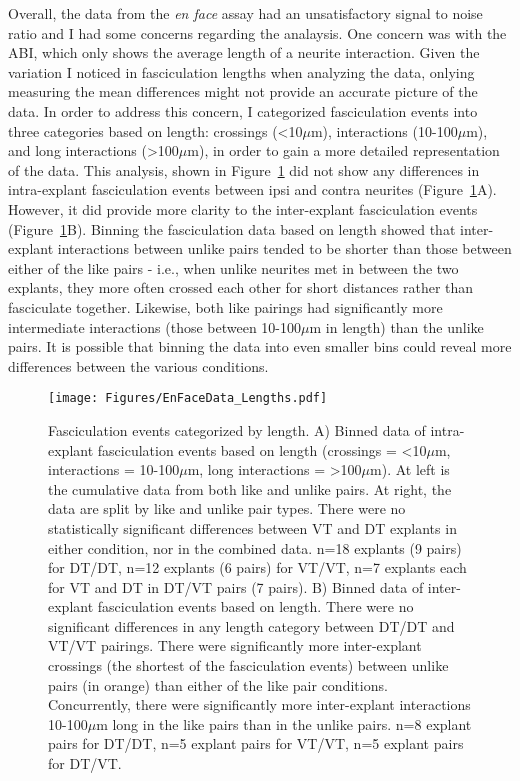 Overall, the data from the \emph{en face} assay had an unsatisfactory signal to noise ratio and I had some concerns regarding the analaysis.
One concern was with the ABI, which only shows the average length of a neurite interaction.
Given the variation I noticed in fasciculation lengths when analyzing the data, onlying measuring the mean differences might not provide an accurate picture of the data.
In order to address this concern, I categorized fasciculation events into three categories based on length: crossings (<10$\mu$m), interactions (10-100$\mu$m), and long interactions (>100$\mu$m), in order to gain a more detailed representation of the data.
This analysis, shown in Figure~\ref{Figures/EnFaceDataLengths} did not show any differences in intra-explant fasciculation events between ipsi and contra neurites (Figure~\ref{Figures/EnFaceDataLengths}A).
However, it did provide more clarity to the inter-explant fasciculation events (Figure~\ref{Figures/EnFaceDataLengths}B).
Binning the fasciculation data based on length showed that inter-explant interactions between unlike pairs tended to be shorter than those between either of the like pairs - i.e., when unlike neurites met in between the two explants, they more often crossed each other for short distances rather than fasciculate together.
Likewise, both like pairings had significantly more intermediate interactions (those between 10-100$\mu$m in length) than the unlike pairs.
It is possible that binning the data into even smaller bins could reveal more differences between the various conditions.
\begin{figure}[hbtp]
    \begin{center}
        \texttt{[image: Figures/EnFaceData\_Lengths.pdf]}
        \caption[Fasciculation events categorized by length.]
        {Fasciculation events categorized by length.
        A) Binned data of intra-explant fasciculation events based on length (crossings = <10$\mu$m, interactions = 10-100$\mu$m, long interactions = >100$\mu$m).
        At left is the cumulative data from both like and unlike pairs.
        At right, the data are split by like and unlike pair types.
        There were no statistically significant differences between VT and DT explants in either condition, nor in the combined data.
        n=18 explants (9 pairs) for DT/DT, n=12 explants (6 pairs) for VT/VT, n=7 explants each for VT and DT in DT/VT pairs (7 pairs).
        B) Binned data of inter-explant fasciculation events based on length.
        There were no significant differences in any length category between DT/DT and VT/VT pairings.
        There were significantly more inter-explant crossings (the shortest of the fasciculation events) between unlike pairs (in orange) than either of the like pair conditions.
        Concurrently, there were significantly more inter-explant interactions 10-100$\mu$m long in the like pairs than in the unlike pairs.
        n=8 explant pairs for DT/DT, n=5 explant pairs for VT/VT, n=5 explant pairs for DT/VT.
        }
        \label{Figures/EnFaceDataLengths}
    \end{center}
\end{figure}

